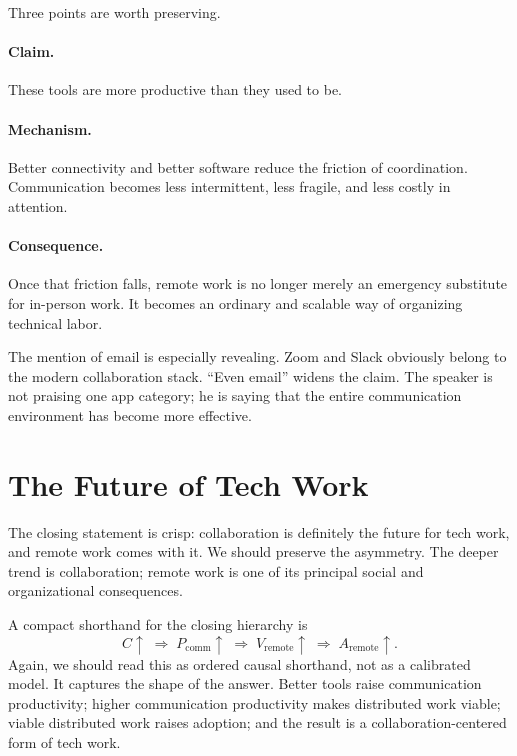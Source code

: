 Three points are worth preserving.

\paragraph{Claim.} These tools are more productive than they used to be.

\paragraph{Mechanism.} Better connectivity and better software reduce the friction of coordination. Communication becomes less intermittent, less fragile, and less costly in attention.

\paragraph{Consequence.} Once that friction falls, remote work is no longer merely an emergency substitute for in-person work. It becomes an ordinary and scalable way of organizing technical labor.

The mention of email is especially revealing. Zoom and Slack obviously belong to the modern collaboration stack. ``Even email'' widens the claim. The speaker is not praising one app category; he is saying that the entire communication environment has become more effective.

\section{The Future of Tech Work}

The closing statement is crisp: collaboration is definitely the future for tech work, and remote work comes with it. We should preserve the asymmetry. The deeper trend is collaboration; remote work is one of its principal social and organizational consequences.

A compact shorthand for the closing hierarchy is
\begin{equation}
C \uparrow
\;\Longrightarrow\;
P_{\mathrm{comm}} \uparrow
\;\Longrightarrow\;
V_{\mathrm{remote}} \uparrow
\;\Longrightarrow\;
A_{\mathrm{remote}} \uparrow .
\end{equation}
Again, we should read this as ordered causal shorthand, not as a calibrated model. It captures the shape of the answer. Better tools raise communication productivity; higher communication productivity makes distributed work viable; viable distributed work raises adoption; and the result is a collaboration-centered form of tech work.

